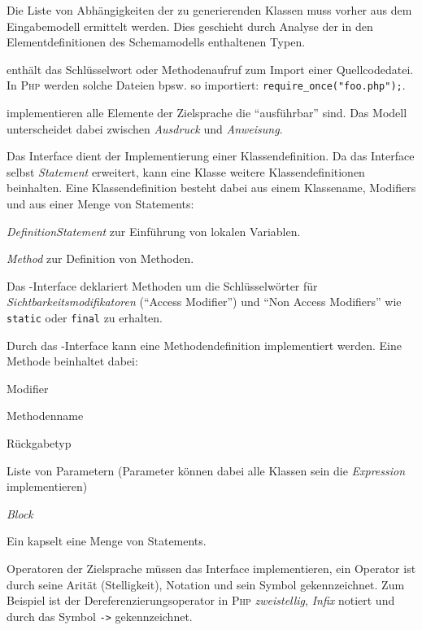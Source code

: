Die Liste von Abhängigkeiten der zu generierenden Klassen muss vorher aus dem Eingabemodell ermittelt werden. Dies geschieht durch Analyse der in den Elementdefinitionen des Schemamodells enthaltenen Typen. 

 enthält das Schlüsselwort oder Methodenaufruf zum Import einer Quellcodedatei. In \textsc{Php} werden solche Dateien bpsw. so importiert: \texttt{require\_once("foo.php");}.

 implementieren alle Elemente der Zielsprache die \enquote{ausführbar} sind. Das Modell unterscheidet dabei zwischen \emph{Ausdruck} und \emph{Anweisung}. 

Das Interface  dient der Implementierung einer Klassendefinition. Da das Interface selbst \emph{Statement} erweitert, kann eine Klasse weitere Klassendefinitionen beinhalten. Eine Klassendefinition besteht dabei aus einem Klassename, Modifiers und aus einer Menge von Statements:
\begin{compactitem}
    \item \emph{DefinitionStatement} zur Einführung von lokalen Variablen.
    \item \emph{Method} zur Definition von Methoden.
\end{compactitem}

Das -Interface deklariert Methoden um die Schlüsselwörter für \emph{Sichtbarkeitsmodifikatoren} (\enquote{Access Modifier}) und \enquote{Non Access Modifiers} wie \texttt{static} oder \texttt{final} zu erhalten.

Durch das -Interface kann eine Methodendefinition implementiert werden. Eine Methode beinhaltet dabei:
\begin{compactitem}
    \item Modifier
    \item Methodenname
    \item Rückgabetyp
    \item Liste von Parametern (Parameter können dabei alle Klassen sein die \emph{Expression} implementieren)
    \item \emph{Block}
\end{compactitem}

Ein  kapselt eine Menge von Statements.

Operatoren der Zielsprache müssen das Interface  implementieren, ein Operator ist durch seine Arität (Stelligkeit), Notation und sein Symbol gekennzeichnet. Zum Beispiel ist der Dereferenzierungsoperator in \textsc{Php} \emph{zweistellig}, \emph{Infix} notiert und durch das Symbol \texttt{->} gekennzeichnet.

